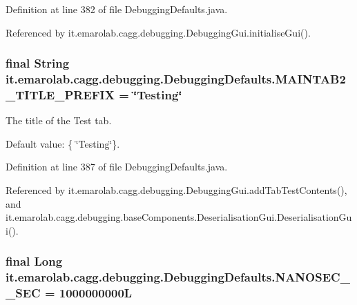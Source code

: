 Definition at line 382 of file Debugging\-Defaults.\-java.



Referenced by it.\-emarolab.\-cagg.\-debugging.\-Debugging\-Gui.\-initialise\-Gui().

\hypertarget{classit_1_1emarolab_1_1cagg_1_1debugging_1_1DebuggingDefaults_a34b8c4d6a2b9a46ae257bb3bafe44d5d}{
\subsubsection[{M\-A\-I\-N\-T\-A\-B2\-\_\-\-T\-I\-T\-L\-E\-\_\-\-P\-R\-E\-F\-I\-X}]{\setlength{\rightskip}{0pt plus 5cm}final String it.\-emarolab.\-cagg.\-debugging.\-Debugging\-Defaults.\-M\-A\-I\-N\-T\-A\-B2\-\_\-\-T\-I\-T\-L\-E\-\_\-\-P\-R\-E\-F\-I\-X = \char`\"{}Testing\char`\"{}\hspace{0.3cm}{\ttfamily [static]}}}\label{classit_1_1emarolab_1_1cagg_1_1debugging_1_1DebuggingDefaults_a34b8c4d6a2b9a46ae257bb3bafe44d5d}
The title of the Test tab.\par
 Default value\-: \{ \char`\"{}\-Testing\char`\"{}\}. 

Definition at line 387 of file Debugging\-Defaults.\-java.



Referenced by it.\-emarolab.\-cagg.\-debugging.\-Debugging\-Gui.\-add\-Tab\-Test\-Contents(), and it.\-emarolab.\-cagg.\-debugging.\-base\-Components.\-Deserialisation\-Gui.\-Deserialisation\-Gui().

\hypertarget{classit_1_1emarolab_1_1cagg_1_1debugging_1_1DebuggingDefaults_aa4ace266347e98c2d5b7fb4d2968e173}{
\subsubsection[{N\-A\-N\-O\-S\-E\-C\-\_\-2\-\_\-\-S\-E\-C}]{\setlength{\rightskip}{0pt plus 5cm}final Long it.\-emarolab.\-cagg.\-debugging.\-Debugging\-Defaults.\-N\-A\-N\-O\-S\-E\-C\-\_\-\_\-\-S\-E\-C = 1000000000\-L\hspace{0.3cm}{\ttfamily [static]}}}\label{classit_1_1emarolab_1_1cagg_1_1debugging_1_1DebuggingDefaults_aa4ace266347e98c2d5b7fb4d2968e173}


